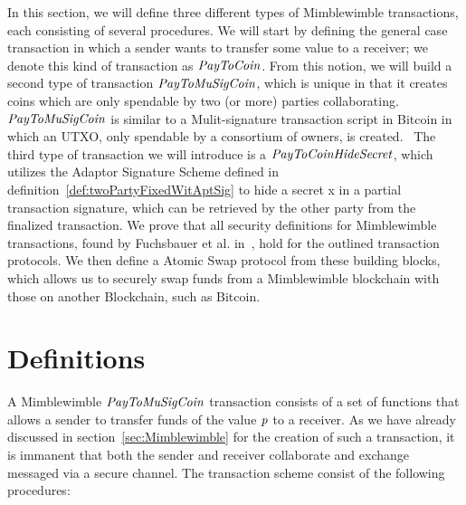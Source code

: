 In this section, we will define three different types of Mimblewimble transactions, each consisting of several procedures.
We will start by defining the general case transaction in which a sender wants to transfer some value to a receiver; we denote this kind of transaction as $\mathit{PayToCoin}$. From this notion,
we will build a second type of transaction $\cnstPayToMuSigCoin$, which is unique in that it creates coins which are only spendable by two (or more) parties collaborating. $\cnstPayToMuSigCoin$ is similar
to a Mulit-signature transaction script in Bitcoin in which an UTXO, only spendable by a consortium of owners, is created.~\cite{bistarelli2018analysis}
The third type of transaction we will introduce is a $\mathit{PayToCoinHideSecret}$, which utilizes the Adaptor Signature Scheme defined in definition~\ref{def:twoPartyFixedWitAptSig} to hide a secret x in a
partial transaction signature, which can be retrieved by the other party from the finalized transaction.
We prove that all security definitions for Mimblewimble transactions, found by Fuchsbauer et al. in~\cite{fuchsbauer2019aggregate}, hold for the outlined transaction protocols.
We then define a Atomic Swap protocol from these building blocks, which allows us to securely swap funds from a Mimblewimble blockchain with those on another Blockchain, such as Bitcoin.

\section{Definitions}

\begin{definition}[$\cnstPayToMuSigCoin$]
    A Mimblewimble $\cnstPayToMuSigCoin$ transaction consists of a set of functions that allows a sender to transfer funds of the value $\mathit{p}$ to a receiver.
    As we have already discussed in section~\ref{sec:Mimblewimble} for the creation of such a transaction, it is immanent that both the sender and receiver collaborate and exchange messaged via a secure channel.
    The transaction scheme consist of the following procedures:
\end{definition}
